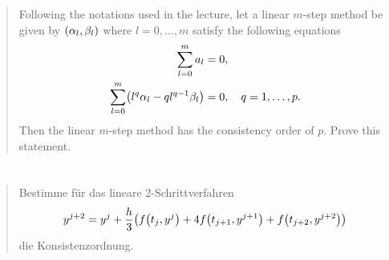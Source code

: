 \documentclass{exercise}
\begin{document}
	\section{}

	\begin{quote}
		Following the notations used in the lecture, let a linear \(m\)-step method be given by \(\parentheses*{\alpha_l, \beta_l}\) where \(l = 0, \ldots, m\) satisfy the following equations
		\begin{align}
			\sum_{l = 0}^m a_l &= 0,\\
			\sum_{l = 0}^m \parentheses*{l^q \alpha_l - ql^{q - 1}\beta_l} &= 0, \quad q = 1, \ldots, p.
		\end{align}
		Then the linear \(m\)-step method has the consistency order of \(p\).
		Prove this statement.
	\end{quote}


	\section{}

	\begin{quote}
		Bestimme für das lineare 2-Schrittverfahren
		\[
			y^{j + 2} = y^j + \frac{h}{3}\parentheses*{f\parentheses*{t_j, y^j} + 4f\parentheses*{t_{j + 1}, y^{j + 1}} + f\parentheses*{t_{j + 2}, y^{j + 2}}}
		\]
		die Konsistenzordnung.
	\end{quote}
\end{document}
